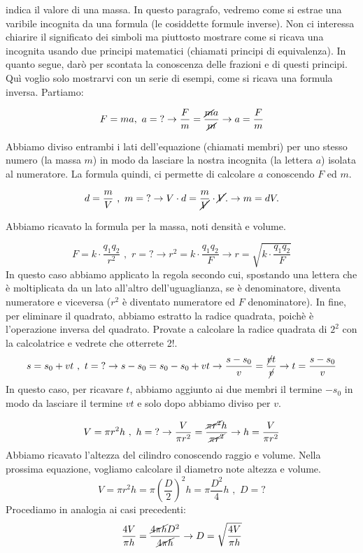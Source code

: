 \documentclass[12pt,a4paper,oneside]{book}
\theoremstyle{esercizio}
\begin{document}
indica il valore di una massa. In questo paragrafo, vedremo come si estrae una varibile incognita da una formula (le cosiddette formule inverse). Non ci interessa chiarire il significato dei simboli ma piuttosto mostrare come si ricava una incognita usando due principi matematici (chiamati principi di equivalenza). In quanto segue, darò per scontata la conoscenza delle frazioni e di questi principi. Quì voglio solo mostrarvi con un serie di esempi, come si ricava una formula inversa. Partiamo:

	
	
	\[F= ma, \,\,  a = \text{?} \rightarrow \frac{F}{m} =\frac{\cancel{m} a}{\cancel{m}}\rightarrow a=\frac{F}{m}
	\]

 Abbiamo diviso entrambi i lati dell'equazione (chiamati membri) per uno stesso numero (la massa $m$) in modo da lasciare la nostra incognita (la lettera $a$) isolata al numeratore. La formula quindi, ci permette di calcolare $a$ conoscendo $F$ ed $m$.

\[
d=\frac{m}{V} \,\,\text{,}\,\,\,  m=\text{?} \rightarrow  V\cdot  d = \frac{m}{\cancel{V}}\cdot \cancel{V}.\rightarrow m = d V.
\]

Abbiamo ricavato la formula per la massa, noti densità e volume.

\[
F=k\cdot \frac{q_1 q_2}{r^2} \,\,\text{,}\,\,\,  r=\text{?} \rightarrow r^2 = k\cdot \frac{q_1 q_2}{F}\rightarrow r=\sqrt{k\cdot \frac{q_1 q_2}{F}}
\]
In questo caso abbiamo applicato la regola secondo cui, spostando una lettera che è moltiplicata da un lato all'altro dell'uguaglianza, se è denominatore, diventa numeratore e viceversa ($r^2$ è diventato numeratore ed $F$ denominatore). In fine, per eliminare il quadrato, abbiamo estratto la radice quadrata, poichè è l'operazione inversa del quadrato. Provate a calcolare la radice quadrata di $2^2$ con la calcolatrice e vedrete che otterrete 2!.
\[
s= s_0 + v t \,\,\text{,}\,\,\,  t=\text{?} \rightarrow s-s_0 = s_0 -s_0 + v t\rightarrow \frac{s-s_0}{v} = \frac{\cancel{v} t }{\cancel{v}}\rightarrow t=\frac{s-s_0}{v}
\]
In questo caso, per ricavare $t$, abbiamo aggiunto ai due membri il termine $-s_0$ in modo da lasciare il termine $v t$ e solo dopo abbiamo diviso per $v$.


\[
V=\pi r^2 h \,\,\text{,}\,\,\,  h=\text{?} \rightarrow \frac{V}{\pi r^2} = \frac{\cancel{ \pi r^2} h}{\cancel{\pi r^2}} \rightarrow h= \frac{V}{\pi r^2 }
\]
Abbiamo ricavato l'altezza del cilindro conoscendo raggio e volume. Nella prossima equazione, vogliamo calcolare il diametro note altezza e volume.
\[
V=\pi r^2 h =\pi \left(\frac{D}{2} \right)^2 h= \pi \frac{D^2}{4}  h\,\,\text{,}\,\,\,  D=\text{?} 
\]
Procediamo in analogia ai casi precedenti:
\[
\frac{4 V}{\pi h} = \frac{ \cancel{ 4 \pi h }D^2 }{ \cancel{4 \pi h}} \rightarrow D=\sqrt{\frac{4 V}{\pi h}}
\]
\end{document}
